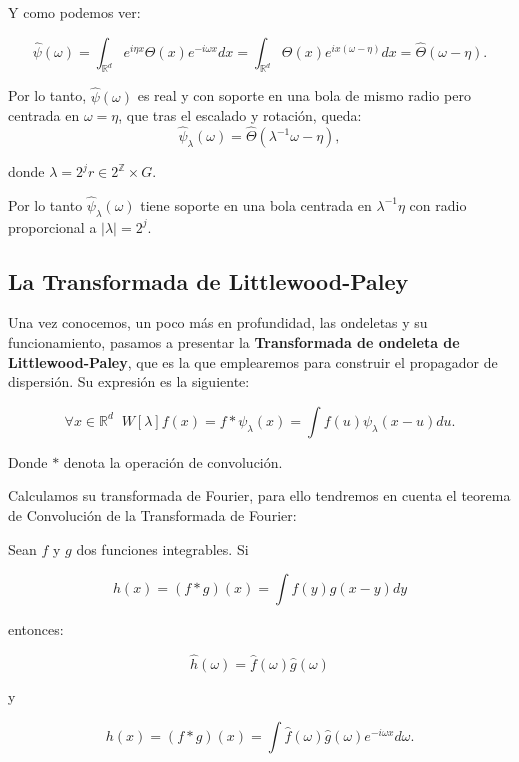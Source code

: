 \medskip

\noindent Y como podemos ver:

\begin{equation}
  \widehat{\psi}(\omega)=\int_{\mathbb{R}^d}e^{i \eta x} \Theta(x) e^{-i\omega x} dx=\int_{\mathbb{R}^d}\Theta(x) e^{ix(\omega-\eta)} dx=\widehat{\Theta}(\omega-\eta).
\end{equation}

\medskip

\noindent Por lo tanto, $\widehat{\psi}(\omega)$ es real y con soporte en una bola de mismo radio pero centrada en $\omega=\eta$, que tras el escalado y rotación, queda: 
$$\widehat{\psi}_\lambda(\omega)= \widehat{\Theta} (\lambda^{-1}\omega-\eta),$$ 

\noindent donde $\lambda=2^jr \in 2^{\mathbb{Z}}\times G$. 

\noindent Por lo tanto $\widehat{\psi}_\lambda(\omega)$ tiene soporte en una bola centrada en $\lambda^{-1}\eta$ con radio proporcional a $|\lambda|=2^j$.
 
\medskip 

\subsection{La Transformada de Littlewood-Paley} \label{ch:seccion12}

\noindent Una vez conocemos, un poco más en profundidad, las ondeletas y su funcionamiento, pasamos a presentar la \textbf{Transformada de ondeleta de Littlewood-Paley}, que es la que emplearemos para construir el propagador de dispersión. Su expresión es la siguiente: 

\begin{equation}
  \forall x \in  \mathbb{R}^d \;\; W[\lambda]f(x)= f \ast \psi_\lambda(x)=\int f(u)\psi_\lambda(x-u) du .
\end{equation}

\noindent Donde $\ast$ denota la operación de convolución. 

\medskip

\noindent Calculamos su transformada de Fourier, para ello tendremos en cuenta el teorema de Convolución de la Transformada de Fourier: 

\begin{teorema} \label{Teorema::Convolucion}
 Sean $f$ y $g$ dos funciones integrables. Si 

 $$h(x)=(f\ast g)(x)=\int f(y)g(x-y) dy$$

 entonces: 

 $$\widehat{h}(\omega)=\widehat{f}(\omega) \widehat{g}(\omega)$$

 y 

 $$h(x)=(f \ast g)(x)= \int \widehat{f}(\omega) \widehat{g}(\omega) e^{-i\omega x} d\omega.$$
 
\end{teorema}

